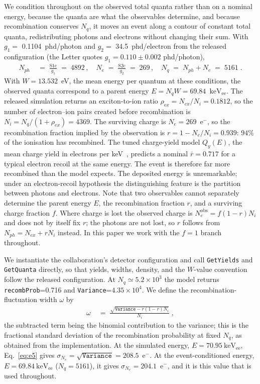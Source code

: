 \documentclass[11pt,a4paper]{article}
\newcommand{\keVee}{\ensuremath{\mathrm{keV_{ee}}}}
\begin{document}
We condition throughout on the observed total quanta rather than on a
nominal energy, because the quanta are what the observables determine,
and because recombination conserves \(N_q\), it moves an event along a
contour of constant total quanta, redistributing photons and electrons
without changing their sum. With \(g_1=\) \SI{0.1104}{phd/photon} and
\(g_2=\) \SI{34.5}{phd/electron} from the released configuration (the
Letter quotes \(g_1=0.110\pm0.002\) phd/photon),
\begin{align}
    \label{eq:e1}
    N_{ph}\;&=\;\frac{\mathrm{S1c}}{g_1}\;=\;4892\,,\quad
    N_e\;=\;\frac{\mathrm{S2c}}{g_2}\;=\;269\,,\quad
    N_q\;=\;N_{ph}+N_e\;=\;5161\;.
\end{align}
With \(W=13.532\)~eV, the mean energy per quantum at these conditions,
the observed quanta correspond to a parent energy
\(E=N_qW=69.84\)~\keVee. The released simulation returns an
exciton-to-ion ratio \(\rho_{ex}=N_{ex}/N_i=0.1812\), so the number of
electron--ion pairs created before recombination is
\(N_i=N_q/(1+\rho_{ex})=4369\). The surviving charge is
\(N_e=269\)~e\(^-\), so the recombination fraction implied by the
observation is \(r=1-N_e/N_i=0.939\): \(94\%\) of the ionisation has
recombined. The tuned charge-yield model \(Q_y(E)\), the mean charge
yield in electrons per keV~\cite{Szydagis:2022ikv,Recomb}, predicts a
nominal \(\bar{r}=0.717\) for a typical electron recoil at the same
energy. The event is therefore far more recombined than the model
expects. The deposited energy is unremarkable; under an electron-recoil
hypothesis the distinguishing feature is the partition between photons
and electrons. Note that two observables cannot separately determine the
parent energy \(E\), the recombination fraction \(r\), and a surviving
charge fraction \(f\). Where charge is lost the observed charge is
\(N_e^{\mathrm{obs}}=f(1-r)N_i\) and does not by itself fix \(r\); the
photons are not lost, so \(r\) follows from \(N_{ph}=N_{ex}+rN_i\)
instead. In this paper we work with the \(f=1\) branch throughout. 

We instantiate the collaboration's detector configuration and call
\texttt{GetYields} and \texttt{GetQuanta} directly, so that yields,
widths, density, and the \(W\)-value convention follow the released
configuration. At \(N_q\simeq5.2\times10^{3}\) the model returns
\texttt{recombProb}=0.716 and \texttt{Variance}=\(4.35\times10^{4}\). We
define the recombination-fluctuation width \(\omega\) by
\begin{align}
    \label{eq:e5}
    \omega\;&=\;\frac{\sqrt{\mathrm{\texttt{Variance}}-r(1-r)N_i}}{N_i}\;,
\end{align}
the subtracted term being the binomial contribution to the variance;
this is the fractional standard deviation of the recombination
probability at fixed \(N_q\), as obtained from the implementation. At
the simulated energy, \(E=70.95~\mathrm{keV_{ee}}\), Eq.~\eqref{eq:e5}
gives \(\sigma_{N_e}=\sqrt{\texttt{Variance}}=208.5\)~e\(^-\). At the
event-conditioned energy, \(E=69.84~\mathrm{keV_{ee}}\)
(\(N_q=5161\)), it gives \(\sigma_{N_e}=204.1\)~e\(^-\), and it is
this value that is used throughout.
\end{document}
